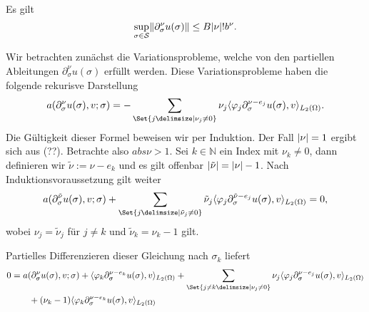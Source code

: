 \begin{Satz}
\label{satz:ps:rg:partielle_ableitungen_schranke}
    Es gilt
    \begin{equation}
        \sup_{\sigma \in \mathcal S} \lVert\partial^{\nu}_{\sigma} u(\sigma)\rVert \leq B \lvert\nu\rvert! b^{\nu}.
    \end{equation}

    \begin{Beweis}
        Wir betrachten zunächst die Variationsprobleme, welche von den partiellen Ableitungen $\partial^{\nu}_{\sigma} u(\sigma)$ erfüllt werden.
        Diese Variationsprobleme haben die folgende rekurisve Darstellung
        \begin{equation}
            a(\partial^{\nu}_{\sigma} u(\sigma), v; \sigma)
            = - \sum_{\Set{j \given \nu_{j} \neq 0}} \nu_{j} \skp{\varphi_{j} \partial^{\nu - e_{j}}_{\sigma} u(\sigma)}{v}{L_{2}(\Omega)}.
        \end{equation}
        Die Gültigkeit dieser Formel beweisen wir per Induktion.
        Der Fall $\lvert\nu\rvert = 1$ ergibt sich aus (??).
        Betrachte also $abs{\nu} > 1$.
        Sei $k \in \mathbb{N}$ ein Index mit $\nu_{k} \neq 0$, dann definieren wir $\tilde{\nu} := \nu - e_{k}$ und es gilt offenbar $\lvert\tilde{\nu}\rvert = \lvert\nu\rvert - 1$.
        Nach Induktionsvoraussetzung gilt weiter
        \begin{equation}
            a(\partial^{\tilde{\nu}}_{\sigma} u(\sigma), v; \sigma) + \sum_{\Set{j \given \tilde{\nu}_{j} \neq 0}} \tilde{\nu}_{j} \skp{\varphi_{j} \partial^{\tilde{\nu} - e_{j}}_{\sigma} u(\sigma)}{v}{L_{2}(\Omega)} = 0,
        \end{equation}
        wobei $\nu_{j} = \tilde{\nu}_{j}$ für $j \neq k$ und $\tilde{\nu}_{k} = \nu_{k} - 1$ gilt.

        Partielles Differenzieren dieser Gleichung nach $\sigma_{k}$ liefert
        \begin{align}
            0 &=
                a(\partial^{\nu}_{\sigma} u(\sigma), v; \sigma)
                + \skp{\varphi_{k} \partial^{\nu - e_{k}}_{\sigma} u(\sigma)}{v}{L_{2}(\Omega)}
                + \sum_{\Set{j \neq k \given \nu_{j} \neq 0}} \nu_{j} \skp{\varphi_{j} \partial^{\nu - e_{j}}_{\sigma} u(\sigma)}{v}{L_{2}(\Omega)}
            \\&\qquad     + (\nu_{k} - 1) \skp{\varphi_{k} \partial^{\nu - e_{k}}_{\sigma} u(\sigma) }{v}{L_{2}(\Omega)}
        \end{align}


\end{Beweis}
\end{Satz}
